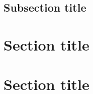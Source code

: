 \subsection{Subsection title}


\section{Section title}



\section{Section title}


\printbibliography[heading=bibliography, title={References}]

